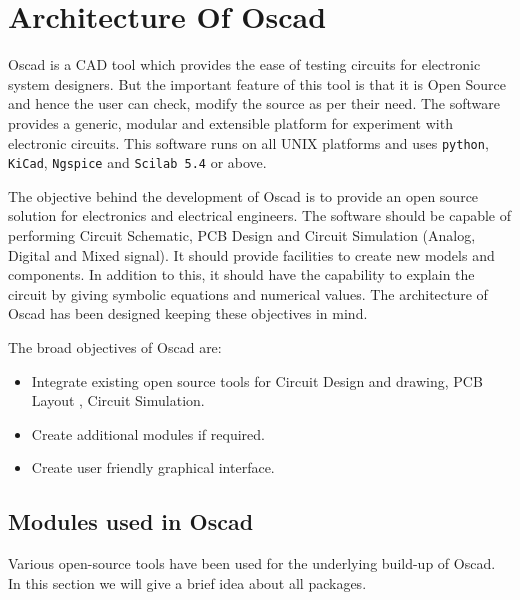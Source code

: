 
\chapter {Architecture Of Oscad}
\label{chap3}

Oscad is a CAD  tool which provides the ease of testing circuits for electronic system designers. But the important feature of this tool is that it is Open Source and hence the user can check, modify the source as per their need. The software provides a generic, modular and extensible platform for experiment with electronic circuits. This software runs on all UNIX platforms and uses {\tt python}, {\tt KiCad}, {\tt Ngspice} and {\tt Scilab 5.4} or above.

The objective behind the development of Oscad is to provide an open source solution for electronics and electrical engineers. The software should be capable of performing Circuit Schematic, PCB Design and Circuit Simulation (Analog, Digital and Mixed signal). It should provide facilities to create new models and components. In addition to this, it should have the capability to explain the circuit by giving symbolic equations and numerical values. The architecture of Oscad has been designed keeping these objectives in mind.


The broad objectives of Oscad are:
\begin{itemize}
\item Integrate existing open source tools for Circuit Design and drawing, PCB Layout , Circuit Simulation.
\item Create additional modules if required.
\item Create user friendly graphical interface.
\end{itemize} 



\section {Modules used in Oscad}
Various open-source tools have been used for the underlying build-up of Oscad. In this section we will give a brief idea about all packages. 


